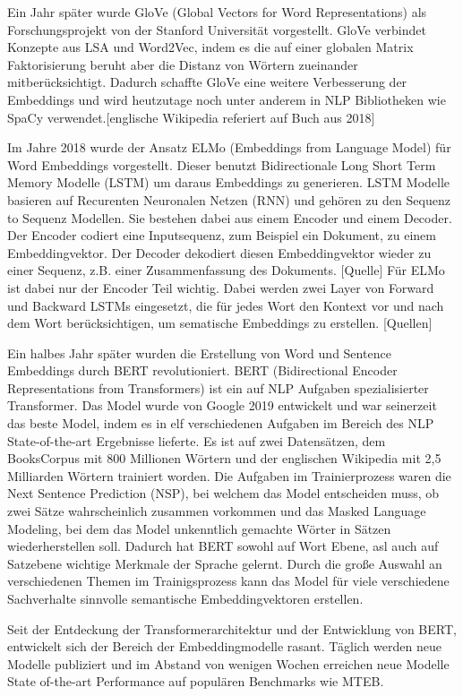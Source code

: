 Ein Jahr später wurde GloVe (Global Vectors for Word Representations) als Forschungsprojekt von der Stanford Universität vorgestellt.
GloVe verbindet Konzepte aus LSA und Word2Vec, indem es die auf einer globalen Matrix Faktorisierung beruht aber die Distanz von Wörtern zueinander mitberücksichtigt.
Dadurch schaffte GloVe eine weitere Verbesserung der Embeddings und wird heutzutage noch unter anderem in NLP Bibliotheken wie SpaCy verwendet.[englische Wikipedia referiert auf Buch aus 2018]

Im Jahre 2018 wurde der Ansatz ELMo (Embeddings from Language Model) für Word Embeddings vorgestellt.
Dieser benutzt Bidirectionale Long Short Term Memory Modelle (LSTM) um daraus Embeddings zu generieren.
LSTM Modelle basieren auf Recurenten Neuronalen Netzen (RNN) und gehören zu den Sequenz to Sequenz Modellen. 
Sie bestehen dabei aus einem Encoder und einem Decoder.
Der Encoder codiert eine Inputsequenz, zum Beispiel ein Dokument, zu einem Embeddingvektor. 
Der Decoder dekodiert diesen Embeddingvektor wieder zu einer Sequenz, z.B. einer Zusammenfassung des Dokuments. [Quelle]
Für ELMo ist dabei nur der Encoder Teil wichtig.
Dabei werden zwei Layer von Forward und Backward LSTMs eingesetzt, die für jedes Wort den Kontext vor und nach dem Wort berücksichtigen, um sematische Embeddings zu erstellen. [Quellen]

Ein halbes Jahr später wurden die Erstellung von Word und Sentence Embeddings durch BERT revolutioniert.
BERT (Bidirectional Encoder Representations from Transformers) \cite{devlin2019} ist ein auf NLP Aufgaben spezialisierter Transformer.
Das Model wurde von Google 2019 entwickelt und war seinerzeit das beste Model, indem es in elf verschiedenen Aufgaben im Bereich des NLP State-of-the-art Ergebnisse lieferte.
Es ist auf zwei Datensätzen, dem BooksCorpus mit 800 Millionen Wörtern und der englischen Wikipedia mit 2,5 Milliarden Wörtern trainiert worden. 
Die Aufgaben im Trainierprozess waren die Next Sentence Prediction (NSP), bei welchem das Model entscheiden muss, ob zwei Sätze wahrscheinlich zusammen vorkommen und das Masked Language Modeling, bei dem das Model unkenntlich gemachte Wörter in Sätzen wiederherstellen soll.
Dadurch hat BERT sowohl auf Wort Ebene, asl auch auf Satzebene wichtige Merkmale der Sprache gelernt.
Durch die große Auswahl an verschiedenen Themen im Trainigsprozess kann das Model für viele verschiedene Sachverhalte sinnvolle semantische Embeddingvektoren erstellen.
\cite{devlin2019}


Seit der Entdeckung der Transformerarchitektur und der Entwicklung von BERT, entwickelt sich der Bereich der Embeddingmodelle rasant.
Täglich werden neue Modelle publiziert und im Abstand von wenigen Wochen erreichen neue Modelle State of-the-art Performance auf populären Benchmarks wie MTEB.  



